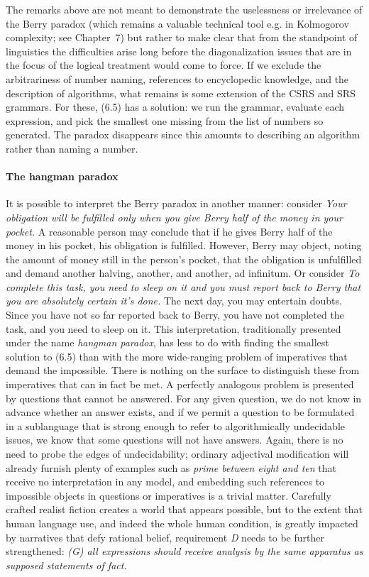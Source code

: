 The remarks above are not meant to demonstrate the uselessness or
irrelevance of the Berry paradox (which remains a valuable technical tool 
e.g. in Kolmogorov complexity; see Chapter~7) but rather to make clear that
from the standpoint of linguistics the difficulties arise long before the
diagonalization issues that are in the focus of the logical treatment would
come to force. If we exclude the arbitrariness of number naming, references to
encyclopedic knowledge, and the description of algorithms, what remains is
some extension of the CSRS and SRS grammars. For these, (6.5) has a solution:
we run the grammar, evaluate each expression, and pick the smallest one
missing from the list of numbers so generated. The paradox disappears since
this amounts to describing an algorithm rather than naming a number.

\paragraph{The hangman paradox}
It is possible to interpret the Berry paradox in another manner: consider {\it
  Your obligation will be fulfilled only when you give Berry half of the money
  in your pocket.} A reasonable person may conclude that if he gives Berry
half of the money in his pocket, his obligation is fulfilled.  However, Berry
may object, noting the amount of money still in the person's pocket, that the
obligation is unfulfilled and demand another halving, another, and another, ad
infinitum. Or consider {\it To complete this task, you need to sleep on it and
  you must report back to Berry that you are absolutely certain it's done.}
The next day, you may entertain doubts. Since you have not so far reported
back to Berry, you have not completed the task, and you need to sleep on it.
This interpretation, traditionally presented under the name {\it hangman
  paradox},  has less to do with finding the smallest
solution to (6.5) than with the more wide-ranging problem of imperatives that
demand the impossible. There is nothing on the surface to distinguish these
from imperatives that can in fact be met. A perfectly analogous problem is
presented by questions that cannot be answered. For any given question, we do
not know in advance whether an answer exists, and if we permit a question to
be formulated in a sublanguage that is strong enough to refer to
algorithmically undecidable issues, we know that some questions will not have
answers. Again, there is no need to probe the edges of undecidability;
ordinary adjectival modification will already furnish plenty of examples such
as {\it prime between eight and ten} that receive no
interpretation in any model, and embedding such references to impossible
objects in questions or imperatives is a trivial matter. Carefully crafted
realist fiction creates a world that appears possible, but to the extent that
human language use, and indeed the whole human condition, is greatly impacted
by narratives that defy rational belief, requirement {\sl D} needs to be
further strengthened: {\sl (G) all expressions should receive analysis by the
  same apparatus as supposed statements of fact.}

